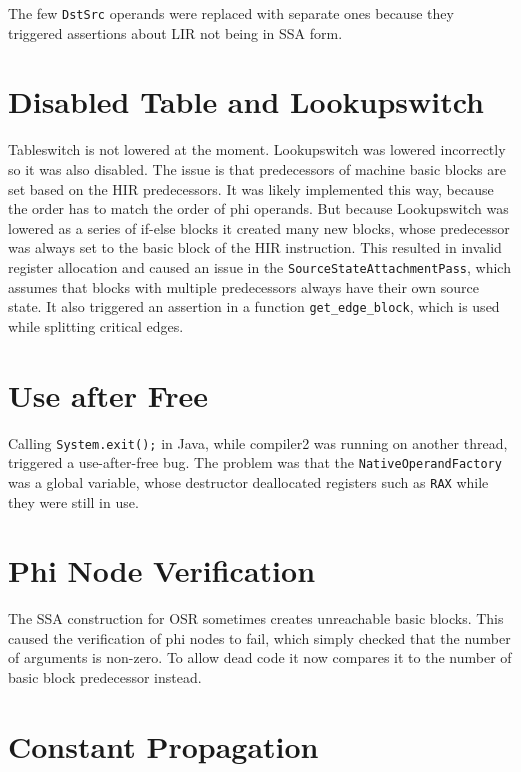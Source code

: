 \documentclass[draft,final]{vutinfth} %
\begin{document}
    The few \lstinline{DstSrc} operands were replaced with separate ones
    because they triggered assertions about LIR not being in SSA form.


    \section{Disabled Table and Lookupswitch}

    Tableswitch is not lowered at the moment.
    Lookupswitch was lowered incorrectly so it was also disabled.
    The issue is that predecessors of machine basic blocks are set based on the HIR predecessors.
    It was likely implemented this way, because the order has to match the order of phi operands.
    But because Lookupswitch was lowered as a series of if-else blocks it created many new blocks,
    whose predecessor was always set to the basic block of the HIR instruction.
    This resulted in invalid register allocation and caused an issue in the \lstinline{SourceStateAttachmentPass},
    which assumes
    that blocks with multiple predecessors always have their own source state.
    It also triggered an assertion in a function \lstinline{get_edge_block}, which is used while splitting critical edges.


    \section{Use after Free}

    Calling \lstinline{System.exit();} in Java,
    while compiler2 was running on another thread,
    triggered a use-after-free bug.
    The problem was that the \lstinline{NativeOperandFactory} was a global variable,
    whose destructor deallocated registers such as \lstinline{RAX} while they were still in use.


    \section{Phi Node Verification}

    The SSA construction for OSR sometimes creates unreachable basic blocks.
    This caused the verification of phi nodes to fail, which simply checked that the number of arguments is non-zero.
    To allow dead code it now compares it to the number of basic block predecessor instead.


    \section{Constant Propagation}
\end{document}
